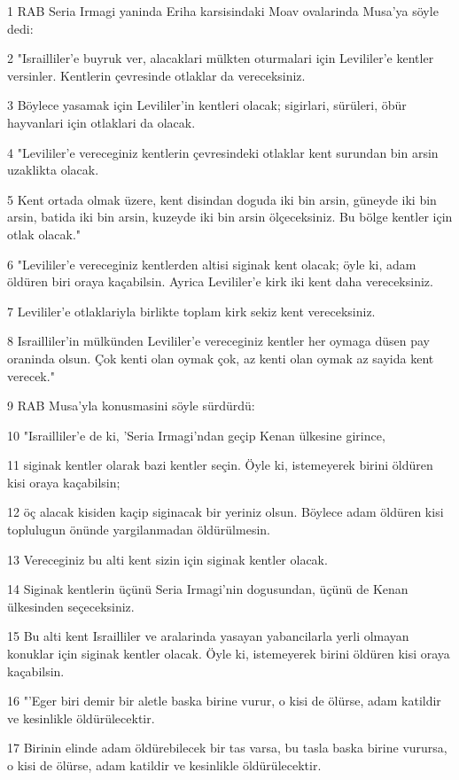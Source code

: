 \par 1 RAB Seria Irmagi yaninda Eriha karsisindaki Moav ovalarinda Musa'ya söyle dedi:
\par 2 "Israilliler'e buyruk ver, alacaklari mülkten oturmalari için Levililer'e kentler versinler. Kentlerin çevresinde otlaklar da vereceksiniz.
\par 3 Böylece yasamak için Levililer'in kentleri olacak; sigirlari, sürüleri, öbür hayvanlari için otlaklari da olacak.
\par 4 "Levililer'e vereceginiz kentlerin çevresindeki otlaklar kent surundan bin arsin uzaklikta olacak.
\par 5 Kent ortada olmak üzere, kent disindan doguda iki bin arsin, güneyde iki bin arsin, batida iki bin arsin, kuzeyde iki bin arsin ölçeceksiniz. Bu bölge kentler için otlak olacak."
\par 6 "Levililer'e vereceginiz kentlerden altisi siginak kent olacak; öyle ki, adam öldüren biri oraya kaçabilsin. Ayrica Levililer'e kirk iki kent daha vereceksiniz.
\par 7 Levililer'e otlaklariyla birlikte toplam kirk sekiz kent vereceksiniz.
\par 8 Israilliler'in mülkünden Levililer'e vereceginiz kentler her oymaga düsen pay oraninda olsun. Çok kenti olan oymak çok, az kenti olan oymak az sayida kent verecek."
\par 9 RAB Musa'yla konusmasini söyle sürdürdü:
\par 10 "Israilliler'e de ki, 'Seria Irmagi'ndan geçip Kenan ülkesine girince,
\par 11 siginak kentler olarak bazi kentler seçin. Öyle ki, istemeyerek birini öldüren kisi oraya kaçabilsin;
\par 12 öç alacak kisiden kaçip siginacak bir yeriniz olsun. Böylece adam öldüren kisi toplulugun önünde yargilanmadan öldürülmesin.
\par 13 Vereceginiz bu alti kent sizin için siginak kentler olacak.
\par 14 Siginak kentlerin üçünü Seria Irmagi'nin dogusundan, üçünü de Kenan ülkesinden seçeceksiniz.
\par 15 Bu alti kent Israilliler ve aralarinda yasayan yabancilarla yerli olmayan konuklar için siginak kentler olacak. Öyle ki, istemeyerek birini öldüren kisi oraya kaçabilsin.
\par 16 "'Eger biri demir bir aletle baska birine vurur, o kisi de ölürse, adam katildir ve kesinlikle öldürülecektir.
\par 17 Birinin elinde adam öldürebilecek bir tas varsa, bu tasla baska birine vurursa, o kisi de ölürse, adam katildir ve kesinlikle öldürülecektir.
